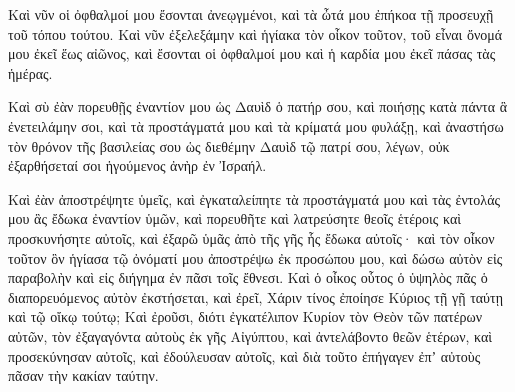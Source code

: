 {Καὶ νῦν οἱ ὀφθαλμοί μου ἔσονται ἀνεῳγμένοι, καὶ τὰ ὦτά μου ἐπήκοα τῇ προσευχῇ τοῦ τόπου τούτου.
Καὶ νῦν ἐξελεξάμην καὶ ἡγίακα τὸν οἶκον τοῦτον, τοῦ εἶναι ὄνομά μου ἐκεῖ ἕως αἰῶνος, καὶ ἔσονται οἱ ὀφθαλμοί μου καὶ ἡ καρδία μου ἐκεῖ πάσας τὰς ἡμέρας.
\par }{\PP {}Καὶ σὺ ἐὰν πορευθῇς ἐναντίον μου ὡς Δαυὶδ ὁ πατήρ σου, καὶ ποιήσῃς κατὰ πάντα ἃ ἐνετειλάμην σοι, καὶ τὰ προστάγματά μου καὶ τὰ κρίματά μου φυλάξῃ,
καὶ ἀναστήσω τὸν θρόνον τῆς βασιλείας σου ὡς διεθέμην Δαυὶδ τῷ πατρί σου, λέγων, οὐκ ἐξαρθήσεταί σοι ἡγούμενος ἀνὴρ ἐν Ἰσραήλ.
\par }{\PP {}Καὶ ἐὰν ἀποστρέψητε ὑμεῖς, καὶ ἐγκαταλείπητε τὰ προστάγματά μου καὶ τὰς ἐντολάς μου ἃς ἔδωκα ἐναντίον ὑμῶν, καὶ πορευθῆτε καὶ λατρεύσητε θεοῖς ἑτέροις καὶ προσκυνήσητε αὐτοῖς,
καὶ ἐξαρῶ ὑμᾶς ἀπὸ τῆς γῆς ἧς ἔδωκα αὐτοῖς· καὶ τὸν οἶκον τοῦτον ὃν ἡγίασα τῷ ὀνόματί μου ἀποστρέψω ἐκ προσώπου μου, καὶ δώσω αὐτὸν εἰς παραβολὴν καὶ εἰς διήγημα ἐν πᾶσι τοῖς ἔθνεσι.
Καὶ ὁ οἶκος οὗτος ὁ ὑψηλὸς πᾶς ὁ διαπορευόμενος αὐτὸν ἐκστήσεται, καὶ ἐρεῖ, Χάριν τίνος ἐποίησε Κύριος τῇ γῇ ταύτῃ καὶ τῷ οἴκῳ τούτῳ;
Καὶ ἐροῦσι, διότι ἐγκατέλιπον Κυρίον τὸν Θεὸν τῶν πατέρων αὐτῶν, τὸν ἐξαγαγόντα αὐτοὺς ἐκ γῆς Αἰγύπτου, καὶ ἀντελάβοντο θεῶν ἑτέρων, καὶ προσεκύνησαν αὐτοῖς, καὶ ἐδούλευσαν αὐτοῖς, καὶ διὰ τοῦτο ἐπήγαγεν ἐπʼ αὐτοὺς πᾶσαν τὴν κακίαν ταύτην.

}
